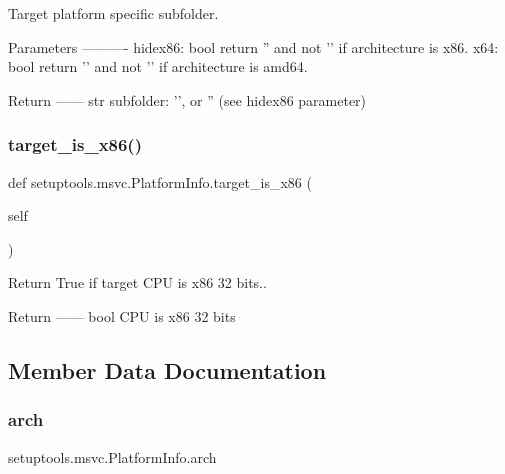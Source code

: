 \begin{DoxyVerb}Target platform specific subfolder.

Parameters
----------
hidex86: bool
    return '' and not '' if architecture is x86.
x64: bool
    return '' and not '' if architecture is amd64.

Return
------
str
    subfolder: '\current', or '' (see hidex86 parameter)
\end{DoxyVerb}
 \mbox{\label{classsetuptools_1_1msvc_1_1PlatformInfo_a33202c8f736ad183994d06b48b7afd6f}} 
\subsubsection{\texorpdfstring{target\+\_\+is\+\_\+x86()}{target\_is\_x86()}}
{\footnotesize\ttfamily def setuptools.\+msvc.\+Platform\+Info.\+target\+\_\+is\+\_\+x86 (\begin{DoxyParamCaption}\item[{}]{self }\end{DoxyParamCaption})}

\begin{DoxyVerb}Return True if target CPU is x86 32 bits..

Return
------
bool
    CPU is x86 32 bits
\end{DoxyVerb}
 

\subsection{Member Data Documentation}
\mbox{\label{classsetuptools_1_1msvc_1_1PlatformInfo_a35417db9c47564d7101f92145515092c}} 
\subsubsection{\texorpdfstring{arch}{arch}}
{\footnotesize\ttfamily setuptools.\+msvc.\+Platform\+Info.\+arch}

